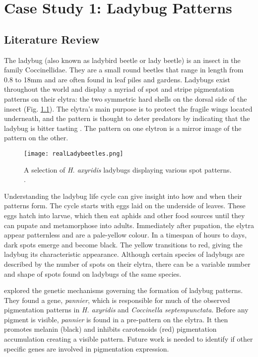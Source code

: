 \chapter{Case Study 1: Ladybug Patterns}
\section{Literature Review}
The ladybug (also known as ladybird beetle or lady beetle) is an insect in the family Coccinellidae. They are a small round beetles that range in length from 0.8 to 18mm \citep{King1996} and are often found in leaf piles and gardens. Ladybugs exist throughout the world and display a myriad of spot and stripe pigmentation patterns on their elytra: the two symmetric hard shells on the dorsal side of the insect (Fig. \ref{fig:realLadyBugPatterns}). The elytra's main purpose is to protect the fragile wings located underneath, and the pattern is thought to deter predators by indicating that the ladybug is bitter tasting \citep{King1996}. The pattern on one elytron is a mirror image of the pattern on the other. 

\begin{figure}[ht]
	\centering
	\texttt{[image: realLadybeetles.png]}
	\caption[A selection of \textit{Harmonia axyridis} ladybugs displaying various spot patterns]{A selection of \textit{H. axyridis} ladybugs displaying various spot patterns. .}
	\label{fig:realLadyBugPatterns}
\end{figure}

Understanding the ladybug life cycle can give insight into how and when their patterns form. The cycle starts with eggs laid on the underside of leaves. These eggs hatch into larvae, which then eat aphids and other food sources until they can pupate and metamorphose into adults. Immediately after pupation, the elytra appear patternless and are a pale-yellow colour. In a timespan of hours to days, dark spots emerge and become black. The yellow transitions to red, giving the ladybug its characteristic appearance. Although certain species of ladybugs are described by the number of spots on their elytra, there can be a variable number and shape of spots found on ladybugs of the same species.

\citet{Ando2018} explored the genetic mechanisms governing the formation of ladybug patterns. They found a gene, \textit{pannier}, which is responsible for much of the observed pigmentation patterns in \textit{H. axyridis} and \textit{Coccinella septempunctata}. Before any pigment is visible, \textit{pannier} is found in a pre-pattern on the elytra. It then promotes melanin (black) and inhibits carotenoids (red) pigmentation accumulation creating a visible pattern. Future work is needed to identify if other specific genes are involved in pigmentation expression.

